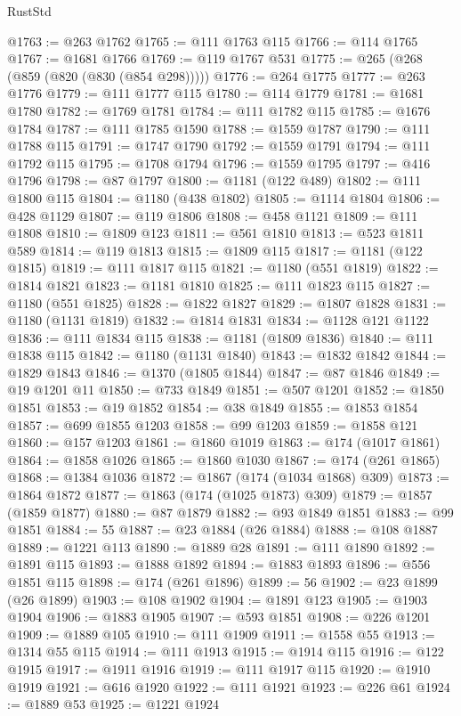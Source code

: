 \begin{lexlean}{RustStd}
\begin{coremodule}
@1763 := @263 @1762
@1765 := @111 @1763 @115
@1766 := @114 @1765
@1767 := @1681 @1766
@1769 := @119 @1767 @531
@1775 := @265 (@268 (@859 (@820 (@830 (@854 @298)))))
@1776 := @264 @1775
@1777 := @263 @1776
@1779 := @111 @1777 @115
@1780 := @114 @1779
@1781 := @1681 @1780
@1782 := @1769 @1781
@1784 := @111 @1782 @115
@1785 := @1676 @1784
@1787 := @111 @1785 @1590
@1788 := @1559 @1787
@1790 := @111 @1788 @115
@1791 := @1747 @1790
@1792 := @1559 @1791
@1794 := @111 @1792 @115
@1795 := @1708 @1794
@1796 := @1559 @1795
@1797 := @416 @1796
@1798 := @87 @1797
@1800 := @1181 (@122 @489)
@1802 := @111 @1800 @115
@1804 := @1180 (@438 @1802)
@1805 := @1114 @1804
@1806 := @428 @1129
@1807 := @119 @1806
@1808 := @458 @1121
@1809 := @111 @1808
@1810 := @1809 @123
@1811 := @561 @1810
@1813 := @523 @1811 @589
@1814 := @119 @1813
@1815 := @1809 @115
@1817 := @1181 (@122 @1815)
@1819 := @111 @1817 @115
@1821 := @1180 (@551 @1819)
@1822 := @1814 @1821
@1823 := @1181 @1810
@1825 := @111 @1823 @115
@1827 := @1180 (@551 @1825)
@1828 := @1822 @1827
@1829 := @1807 @1828
@1831 := @1180 (@1131 @1819)
@1832 := @1814 @1831
@1834 := @1128 @121 @1122
@1836 := @111 @1834 @115
@1838 := @1181 (@1809 @1836)
@1840 := @111 @1838 @115
@1842 := @1180 (@1131 @1840)
@1843 := @1832 @1842
@1844 := @1829 @1843
@1846 := @1370 (@1805 @1844)
@1847 := @87 @1846
@1849 := @19 @1201 @11
@1850 := @733 @1849
@1851 := @507 @1201
@1852 := @1850 @1851
@1853 := @19 @1852
@1854 := @38 @1849
@1855 := @1853 @1854
@1857 := @699 @1855 @1203
@1858 := @99 @1203
@1859 := @1858 @121
@1860 := @157 @1203
@1861 := @1860 @1019
@1863 := @174 (@1017 @1861)
@1864 := @1858 @1026
@1865 := @1860 @1030
@1867 := @174 (@261 @1865)
@1868 := @1384 @1036
@1872 := @1867 (@174 (@1034 @1868) @309)
@1873 := @1864 @1872
@1877 := @1863 (@174 (@1025 @1873) @309)
@1879 := @1857 (@1859 @1877)
@1880 := @87 @1879
@1882 := @93 @1849 @1851
@1883 := @99 @1851
@1884 := 55
@1887 := @23 @1884 (@26 @1884)
@1888 := @108 @1887
@1889 := @1221 @113
@1890 := @1889 @28
@1891 := @111 @1890
@1892 := @1891 @115
@1893 := @1888 @1892
@1894 := @1883 @1893
@1896 := @556 @1851 @115
@1898 := @174 (@261 @1896)
@1899 := 56
@1902 := @23 @1899 (@26 @1899)
@1903 := @108 @1902
@1904 := @1891 @123
@1905 := @1903 @1904
@1906 := @1883 @1905
@1907 := @593 @1851
@1908 := @226 @1201
@1909 := @1889 @105
@1910 := @111 @1909
@1911 := @1558 @55
@1913 := @1314 @55 @115
@1914 := @111 @1913
@1915 := @1914 @115
@1916 := @122 @1915
@1917 := @1911 @1916
@1919 := @111 @1917 @115
@1920 := @1910 @1919
@1921 := @616 @1920
@1922 := @111 @1921
@1923 := @226 @61
@1924 := @1889 @53
@1925 := @1221 @1924

\end{coremodule}
\end{lexlean}
